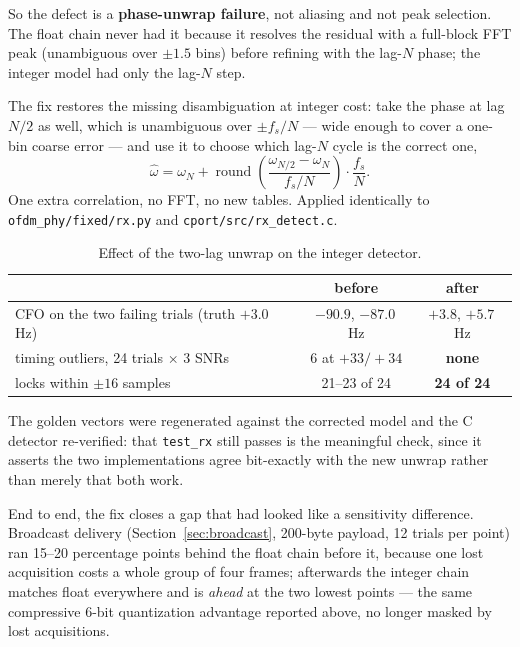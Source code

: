 So the defect is a \textbf{phase-unwrap failure}, not aliasing and not
peak selection.  The float chain never had it because it resolves the
residual with a full-block FFT peak (unambiguous over $\pm1.5$ bins)
before refining with the lag-$N$ phase; the integer model had only the
lag-$N$ step.

The fix restores the missing disambiguation at integer cost: take the
phase at lag $N/2$ as well, which is unambiguous over $\pm f_s/N$ ---
wide enough to cover a one-bin coarse error --- and use it to choose
which lag-$N$ cycle is the correct one,
\[
    \hat{\omega} = \omega_N + \operatorname{round}\!\left(
        \frac{\omega_{N/2} - \omega_N}{f_s/N}\right)\cdot \frac{f_s}{N} .
\]
One extra correlation, no FFT, no new tables.  Applied identically to
\texttt{ofdm\_phy/fixed/rx.py} and \texttt{cport/src/rx\_detect.c}.

\begin{table}[H]
    \centering
    \caption{Effect of the two-lag unwrap on the integer detector.}
    \label{tab:unwrap}
    \begin{tabular}{lcc}
        \toprule
        & before & after \\
        \midrule
        CFO on the two failing trials (truth $+3.0$\,Hz)
            & $-90.9$, $-87.0$\,Hz & $+3.8$, $+5.7$\,Hz \\
        timing outliers, 24 trials $\times$ 3 SNRs
            & 6 at $+33/+34$ & \textbf{none} \\
        locks within $\pm16$ samples
            & 21--23 of 24 & \textbf{24 of 24} \\
        \bottomrule
    \end{tabular}
\end{table}

The golden vectors were regenerated against the corrected model and the
C detector re-verified: that \texttt{test\_rx} still passes is the
meaningful check, since it asserts the two implementations agree
bit-exactly with the new unwrap rather than merely that both work.

End to end, the fix closes a gap that had looked like a sensitivity
difference.  Broadcast delivery (Section~\ref{sec:broadcast}, 200-byte
payload, 12 trials per point) ran 15--20 percentage points behind the
float chain before it, because one lost acquisition costs a whole group
of four frames; afterwards the integer chain matches float everywhere
and is \emph{ahead} at the two lowest points --- the same compressive
6-bit quantization advantage reported above, no longer masked by lost
acquisitions.

